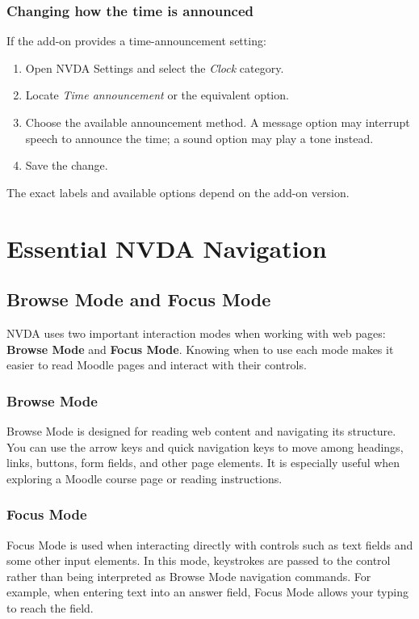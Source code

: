 \documentclass[11pt,oneside]{book}
\begin{document}
\section{Changing how the time is announced}
If the add-on provides a time-announcement setting:
\begin{enumerate}
	\item Open NVDA Settings and select the \textit{Clock} category.
	\item Locate \textit{Time announcement} or the equivalent option.
	\item Choose the available announcement method. A message option may interrupt speech to announce the time; a sound option may play a tone instead.
	\item Save the change.
\end{enumerate}
The exact labels and available options depend on the add-on version.

\part{Essential NVDA Navigation}

\chapter{Browse Mode and Focus Mode}
NVDA uses two important interaction modes when working with web pages: \textbf{Browse Mode} and \textbf{Focus Mode}. Knowing when to use each mode makes it easier to read Moodle pages and interact with their controls.

\section{Browse Mode}
Browse Mode is designed for reading web content and navigating its structure. You can use the arrow keys and quick navigation keys to move among headings, links, buttons, form fields, and other page elements. It is especially useful when exploring a Moodle course page or reading instructions.

\section{Focus Mode}
Focus Mode is used when interacting directly with controls such as text fields and some other input elements. In this mode, keystrokes are passed to the control rather than being interpreted as Browse Mode navigation commands. For example, when entering text into an answer field, Focus Mode allows your typing to reach the field.
\end{document}
